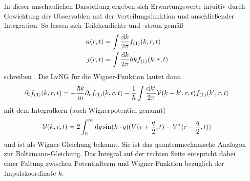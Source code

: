 In dieser anschaulichen Darstellung ergeben sich Erwartungswerte intuitiv durch Gewichtung der Observablen mit der Verteilungsfunktion und anschließender Integration. So lassen sich Teilchendichte und -strom gemäß
\begin{align}
  n(r,t) &= \int \frac{\mathop{}\!\mathrm{d} k}{2\pi}f_{(1)}(k,r,t) \label{eq:wigner_n}\\
  j(r,t) &= \int \frac{\mathop{}\!\mathrm{d} k}{2\pi}\hbar k f_{(1)}(k,r,t)
\end{align}
schreiben \cite{modern}. Die LvNG für die Wigner-Funktion lautet dann \cite{frensley2, failure}
\begin{equation}
  \partial_t f_{(1)}(k,r,t) = -\frac{\hbar k}{m}\partial_r f_{(1)}(k,r,t) - \frac{1}{\hbar} \int \frac{\mathop{}\!\mathrm{d} k'}{2\pi}\mathcal{V}(k-k',r,t)f_{(1)}(k',r,t)
  \label{eq:wigner}
\end{equation}
mit dem Integralkern (auch Wignerpotential genannt)
\begin{equation*}
  \mathcal{V}(k,r,t) = 2\int_0^{\infty} \mathop{}\!\mathrm{d} q \sin(k\cdot q) (V(r+\frac{q}{2},t) - V^*(r-\frac{q}{2},t))
\end{equation*}
und ist als Wigner-Gleichung bekannt. Sie ist das quantenmechanische Analogon zur Boltzmann-Gleichung. Das Integral auf der rechten Seite entspricht dabei einer Faltung zwischen Potentialterm und Wigner-Funktion bezüglich der Impulskoordinate $k$.



